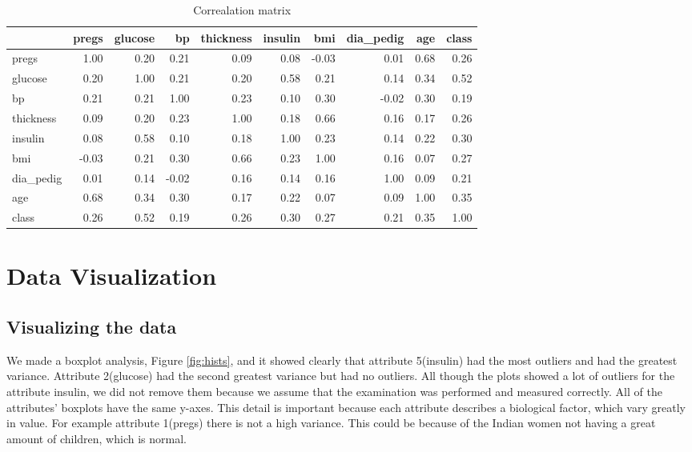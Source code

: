 \begin{table}
\caption{Correalation matrix}\label{tab:cor}
\begin{tabular}{lrrrrrrrrr}
{} &  pregs &  glucose &    bp &  thickness &  insulin &   bmi &  dia\_pedig &   age &  class \\
\midrule
pregs     &   1.00 &     0.20 &  0.21 &       0.09 &     0.08 & -0.03 &       0.01 &  0.68 &   0.26 \\
glucose   &   0.20 &     1.00 &  0.21 &       0.20 &     0.58 &  0.21 &       0.14 &  0.34 &   0.52 \\
bp        &   0.21 &     0.21 &  1.00 &       0.23 &     0.10 &  0.30 &      -0.02 &  0.30 &   0.19 \\
thickness &   0.09 &     0.20 &  0.23 &       1.00 &     0.18 &  0.66 &       0.16 &  0.17 &   0.26 \\
insulin   &   0.08 &     0.58 &  0.10 &       0.18 &     1.00 &  0.23 &       0.14 &  0.22 &   0.30 \\
bmi       &  -0.03 &     0.21 &  0.30 &       0.66 &     0.23 &  1.00 &       0.16 &  0.07 &   0.27 \\
dia\_pedig &   0.01 &     0.14 & -0.02 &       0.16 &     0.14 &  0.16 &       1.00 &  0.09 &   0.21 \\
age       &   0.68 &     0.34 &  0.30 &       0.17 &     0.22 &  0.07 &       0.09 &  1.00 &   0.35 \\
class     &   0.26 &     0.52 &  0.19 &       0.26 &     0.30 &  0.27 &       0.21 &  0.35 &   1.00 \\
\bottomrule
\end{tabular}
\end{table}

\section{Data Visualization}

\subsection{Visualizing the data}
We made a boxplot analysis, Figure \ref{fig:hists}, and it showed clearly that attribute 5(insulin) had the most outliers
and had the greatest variance. Attribute 2(glucose) had the second greatest variance but had no outliers.
All though the plots showed a lot of outliers for the attribute insulin, we did not remove them because we
assume that the examination was performed and measured correctly.
All of the attributes' boxplots have the same y-axes. This detail is important because each attribute describes a
biological factor, which vary greatly in value.
For example attribute 1(pregs) there is not a high variance. This could be because of the Indian women not having
a great amount of children, which is normal.

